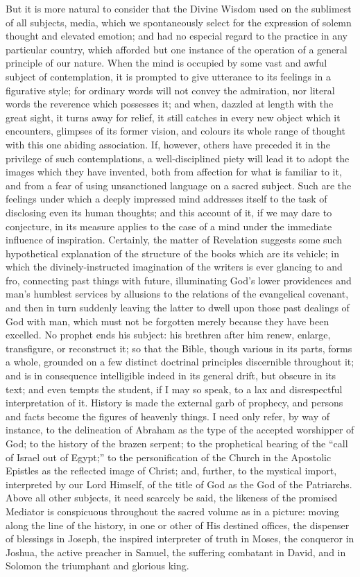 But it is more natural to consider that the Divine Wisdom used on
the sublimest of all subjects, media, which we spontaneously select
for the expression of solemn thought and elevated emotion; and had no
especial regard to the practice in any particular country, which
afforded but one instance of the operation of a general principle of
our nature. When the mind is occupied by some vast and awful subject
of contemplation, it is prompted to give utterance to its feelings in
a figurative style; for ordinary words will not convey the admiration,
nor literal words the reverence which possesses it; and when, dazzled
at length with the great sight, it turns away for relief, it still
catches in every new object which it encounters, glimpses of its
former vision, and colours its whole range of thought with this one
abiding association. If, however, others have preceded it in the
privilege of such contemplations, a well-disciplined piety will lead
it to adopt the images which they have invented, both from affection
for what is familiar to it, and from a fear of using unsanctioned
language on a sacred subject. Such are the feelings under which a
deeply impressed mind addresses itself to the task of disclosing even
its human thoughts; and this account of it, if we may dare to
conjecture, in its measure applies to the case of a mind under the
immediate influence of inspiration. Certainly, the matter of
Revelation suggests some such hypothetical explanation of the
structure of the books which are its vehicle; in which the
divinely-instructed imagination of the writers is ever glancing to and
fro, connecting past things with future, illuminating God's lower
providences and man's humblest services by allusions to the relations
of the evangelical covenant, and then in turn suddenly leaving the
latter to dwell upon those past dealings of God with man, which must
not be forgotten merely because they have been excelled. No prophet
ends his subject: his brethren after him renew, enlarge, transfigure,
or reconstruct it; so that the Bible, though various in its parts,
forms a whole, grounded on a few distinct doctrinal principles
discernible throughout it; and is in consequence intelligible indeed
in its general drift, but obscure in its text; and even tempts the
student, if I may so speak, to a lax and disrespectful interpretation
of it. History is made the external garb of prophecy, and persons and
facts become the figures of heavenly things. I need only refer, by way
of instance, to the delineation of Abraham as the type of the
accepted worshipper of God; to the history of the brazen serpent; to
the prophetical bearing of the ``call of Israel out of
Egypt;'' to the personification of the Church in the Apostolic
Epistles as the reflected image of Christ; and, further, to the
mystical import, interpreted by our Lord Himself, of the title of God
as the God of the Patriarchs. Above all other subjects, it need
scarcely be said, the likeness of the promised Mediator is conspicuous
throughout the sacred volume as in a picture: moving along the line of
the history, in one or other of His destined offices, the dispenser of
blessings in Joseph, the inspired interpreter of truth in Moses, the
conqueror in Joshua, the active preacher in Samuel, the suffering
combatant in David, and in Solomon the triumphant and glorious king.


